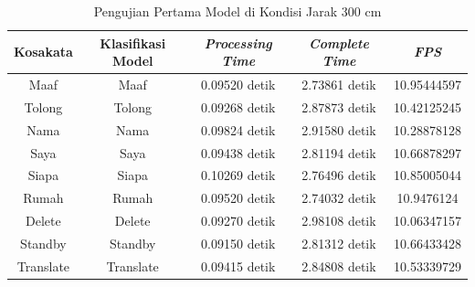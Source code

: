 \begin{longtable}{|c|c|c|c|c|}
  \caption{Pengujian Pertama Model di Kondisi Jarak 300 cm}
  \label{tb:prediksijauh1}                                   \\
  \hline
  \rowcolor[HTML]{C0C0C0}
  \textbf{Kosakata} & \textbf{Klasifikasi Model} & \textbf{\emph{Processing Time}} & \textbf{\emph{Complete Time}} & \textbf{\emph{FPS}}\\
  \hline
  Maaf              & Maaf                          & 0.09520 detik                           & 2.73861 detik                                  & 10.95444597\\
  Tolong            & Tolong                        & 0.09268 detik                           & 2.87873 detik                                  & 10.42125245\\
  Nama              & Nama                          & 0.09824 detik                           & 2.91580 detik                                  & 10.28878128\\
  Saya              & Saya                          & 0.09438 detik                           & 2.81194 detik                                  & 10.66878297\\
  Siapa             & Siapa                         & 0.10269 detik                           & 2.76496 detik                                  & 10.85005044\\
  Rumah             & Rumah                         & 0.09520 detik                           & 2.74032 detik                                  & 10.9476124\\
  Delete            & Delete                        & 0.09270 detik                           & 2.98108 detik                                  & 10.06347157\\
  Standby           & Standby                       & 0.09150 detik                           & 2.81312 detik                                  & 10.66433428\\
  Translate         & Translate                     & 0.09415 detik                           & 2.84808 detik                                  & 10.53339729\\
  \hline
\end{longtable}


